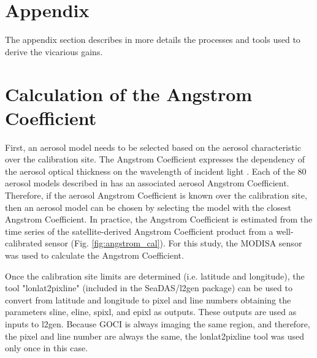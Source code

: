 \documentclass[]{interact}
\theoremstyle{plain}%
\theoremstyle{definition}
\theoremstyle{remark}
\begin{document}
\appendix
\section*{Appendix}
The appendix section describes in more details the processes and tools used to derive the vicarious gains.

\section{Calculation of the Angstrom Coefficient}\label{sec:appendix_Angstrom}
First, an aerosol model needs to be selected based on the aerosol characteristic over the calibration site. The Angstrom Coefficient expresses the dependency of the aerosol optical thickness on the wavelength of incident light \citep{Wang:2005}. Each of the 80 aerosol models described in \cite{Ahmad2010} has an associated aerosol Angstrom Coefficient. Therefore, if the aerosol Angstrom Coefficient is known over the calibration site, then an aerosol model can be chosen by selecting the model with the closest Angstrom Coefficient. In practice, the Angstrom Coefficient is estimated from the time series of the satellite-derived Angstrom Coefficient product from a well-calibrated sensor (Fig. \ref{fig:angstrom_cal}). For this study, the MODISA sensor was used to calculate the Angstrom Coefficient.

Once the calibration site limits are determined (i.e. latitude and longitude), the tool "lonlat2pixline" (included in the SeaDAS/l2gen package) can be used to convert from latitude and longitude to pixel and line numbers obtaining the parameters sline, eline, spixl, and epixl as outputs. These outputs are used as inputs to l2gen. Because GOCI is always imaging the same region, and therefore, the pixel and line number are always the same, the lonlat2pixline tool was used only once in this case.
\end{document}
